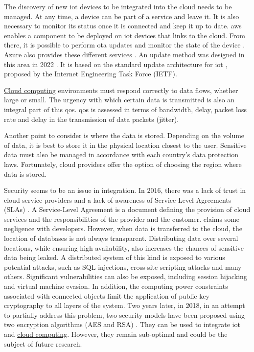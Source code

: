 The discovery of new \acrshort{iot} devices to be integrated into the \gls{cloud} needs to be managed. At any time, a device can be part of a service and leave it. It is also necessary to monitor its status once it is connected and keep it up to date. \gls{aws} enables a component to be deployed on \acrshort{iot} devices that links to the \gls{cloud}. From there, it is possible to perform \acrfull{ota} updates \cite{ota_aws_iot} and monitor the state of the device \cite{status_aws_iot}. Azure also provides these different services \cite{ota_azure_iot, status_azure_iot}. An update method was designed in this area in 2022 \cite{OTA_Solution_proposed}. It is based on the standard update architecture for \acrshort{iot} \cite{firmware_update_architecture_iot}, proposed by the Internet Engineering Task Force (IETF).

\hyperref[subsec:cloudcomputing]{Cloud computing} environments must respond correctly to data flows, whether large or small. The urgency with which certain data is transmitted is also an integral part of this \acrshort{qos}. \acrshort{qos} is assessed in terms of bandwidth, delay, packet loss rate and delay in the transmission of data packets (jitter). \cite{cloud_of_thing}

Another point to consider is where the data is stored. Depending on the volume of data, it is best to store it in the physical location closest to the user. Sensitive data must also be managed in accordance with each country's data protection laws. Fortunately, \gls{cloud} providers offer the option of choosing the region where data is stored. \cite{cloud_of_thing}

Security seems to be an issue in integration. In 2016, there was a lack of trust in \gls{cloud} service providers and a lack of awareness of Service-Level Agreements (SLAs) \cite{survey_integration_iot_cloud_computing}. A Service-Level Agreement is a document defining the provision of \gls{cloud} services and the responsibilities of the provider and the customer.  claims some negligence with developers. However, when data is transferred to the \gls{cloud}, the location of databases is not always transparent. Distributing data over several locations, while ensuring high availability, also increases the chances of sensitive data being leaked. A distributed system of this kind is exposed to various potential attacks, such as SQL injections, cross-site scripting attacks and many others. Significant vulnerabilities can also be exposed, including session hijacking and virtual machine evasion. In addition, the computing power constraints associated with connected objects limit the application of public key cryptography to all layers of the system. Two years later, in 2018, in an attempt to partially address this problem, two security models have been proposed using two encryption algorithms (AES and RSA) \cite{secure_integration_iot_cloud_computing}. They can be used to integrate \acrshort{iot} and \hyperref[subsec:cloudcomputing]{cloud computing}. However, they remain sub-optimal and could be the subject of future research.

